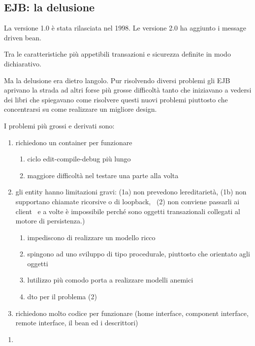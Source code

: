 \documentclass[12pt,twoside]{article}
\newcommand\liststyleLi{%
\renewcommand\labelitemi{[25CF?]}
\renewcommand\labelitemii{[25CB?]}
\renewcommand\labelitemiii{[25A0?]}
\renewcommand\labelitemiv{[25CF?]}
}
\begin{document}
\subsection{EJB: la delusione}
La versione 1.0 \`e stata rilasciata nel 1998. Le versione 2.0 ha
aggiunto i message driven bean. 

Tra le caratteristiche pi\`u appetibili transazioni e sicurezza definite
in modo dichiarativo.


\bigskip

Ma la delusione era dietro l{\textquotesingle}angolo. Pur risolvendo
diversi problemi gli EJB aprivano la strada ad altri forse pi\`u grosse
difficolt\`a tanto che iniziavano a vedersi dei libri che spiegavano
come risolvere questi nuovi problemi piuttosto che concentrarsi su come
realizzare un migliore design.


\bigskip

I problemi pi\`u grossi e derivati sono:

\liststyleLi
\begin{enumerate}
\item richiedono un container per funzionare

\begin{enumerate}
\item ciclo edit{}-compile{}-debug pi\`u lungo
\item maggiore difficolt\`a nel testare una parte alla volta
\end{enumerate}
\item gli entity hanno limitazioni gravi: (1a) non prevedono
l{\textquotesingle}ereditariet\`a, (1b) non supportano chiamate
ricorsive o di loopback, \ (2) non conviene passarli ai client \ e a
volte \`e impossibile perch\'e sono oggetti transazionali collegati al
motore di persistenza.)

\begin{enumerate}
\item impediscono di realizzare un modello ricco
\item spingono ad uno sviluppo di tipo procedurale, piuttosto che
orientato agli oggetti
\item l{\textquotesingle}utilizzo pi\`u comodo porta a realizzare
modelli anemici
\item dto per il problema (2)
\end{enumerate}
\item richiedono molto codice per funzionare (home interface, component
interface, remote interface, il bean ed i descrittori)
\end{enumerate}

\bigskip


\bigskip

\liststyleLi
\begin{enumerate}
\item[] 
\bigskip


\bigskip
\end{enumerate}

\bigskip


\bigskip
\end{document}
